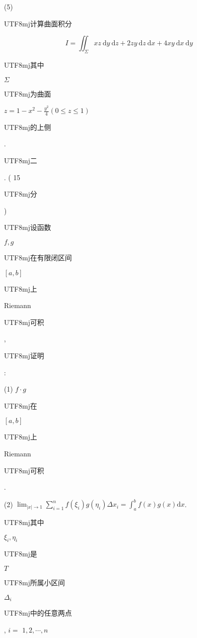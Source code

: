 \documentclass[10pt]{article}
\begin{document}
(5) \begin{CJK}{UTF8}{mj}计算曲面积分\end{CJK}
$$
I=\iint_{\Sigma} x z \mathrm{~d} y \mathrm{~d} z+2 z y \mathrm{~d} z \mathrm{~d} x+4 x y \mathrm{~d} x \mathrm{~d} y
$$
\begin{CJK}{UTF8}{mj}其中\end{CJK} $\Sigma$ \begin{CJK}{UTF8}{mj}为曲面\end{CJK} $z=1-x^{2}-\frac{y^{2}}{4}(0 \leqslant z \leqslant 1)$ \begin{CJK}{UTF8}{mj}的上侧\end{CJK}.

\begin{CJK}{UTF8}{mj}二\end{CJK}. ( 15 \begin{CJK}{UTF8}{mj}分\end{CJK}) \begin{CJK}{UTF8}{mj}设函数\end{CJK} $f, g$ \begin{CJK}{UTF8}{mj}在有限闭区间\end{CJK} $[a, b]$ \begin{CJK}{UTF8}{mj}上\end{CJK} Riemann \begin{CJK}{UTF8}{mj}可积\end{CJK}, \begin{CJK}{UTF8}{mj}证明\end{CJK}:

(1) $f \cdot g$ \begin{CJK}{UTF8}{mj}在\end{CJK} $[a, b]$ \begin{CJK}{UTF8}{mj}上\end{CJK} Riemann \begin{CJK}{UTF8}{mj}可积\end{CJK}.

(2) $\lim _{|x| \rightarrow 1} \sum_{i=1}^{n} f\left(\xi_{i}\right) g\left(\eta_{i}\right) \Delta x_{i}=\int_{a}^{b} f(x) g(x) \mathrm{d} x$. \begin{CJK}{UTF8}{mj}其中\end{CJK} $\xi_{i}, \eta_{i}$ \begin{CJK}{UTF8}{mj}是\end{CJK} $T$ \begin{CJK}{UTF8}{mj}所属小区间\end{CJK} $\Delta_{i}$ \begin{CJK}{UTF8}{mj}中的任意两点\end{CJK}, $i=$ $1,2, \cdots, n$
\end{document}
